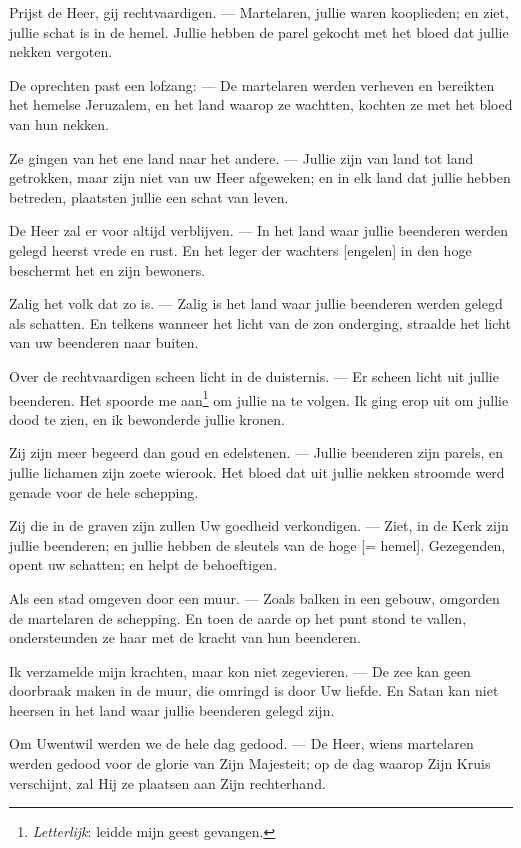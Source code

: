 \documentclass[12pt,twoside,a5paper]{article}
\begin{document}
\begin{halfparskip}
   Prijst de Heer, gij rechtvaardigen. --- Martelaren, jullie waren kooplieden; en ziet, jullie schat is in de hemel. Jullie hebben de parel gekocht met het bloed dat jullie nekken vergoten.

  De oprechten past een lofzang: --- De martelaren werden verheven en bereikten het hemelse Jeruzalem, en het land waarop ze wachtten, kochten ze met het bloed van hun nekken.

  Ze gingen van het ene land naar het andere. --- Jullie zijn van land tot land getrokken, maar zijn niet van uw Heer afgeweken; en in elk land dat jullie hebben betreden, plaatsten jullie een schat van leven.

  De Heer zal er voor altijd verblijven. --- In het land waar jullie beenderen werden gelegd heerst vrede en rust. En het leger der wachters [engelen] in den hoge beschermt het en zijn bewoners.

  Zalig het volk dat zo is. --- Zalig is het land waar jullie beenderen werden gelegd als schatten. En telkens wanneer het licht van de zon onderging, straalde het licht van uw beenderen naar buiten.

  Over de rechtvaardigen scheen licht in de duisternis. --- Er scheen licht uit jullie beenderen. Het spoorde me aan\footnote{\emph{Letterlijk}: leidde mijn geest gevangen.} om jullie na te volgen. Ik ging erop uit om jullie dood te zien, en ik bewonderde jullie kronen.

  Zij zijn meer begeerd dan goud en edelstenen. --- Jullie beenderen zijn parels, en jullie lichamen zijn zoete wierook. Het bloed dat uit jullie nekken stroomde werd genade voor de hele schepping.

  Zij die in de graven zijn zullen Uw goedheid verkondigen. --- Ziet, in de Kerk zijn jullie beenderen; en jullie hebben de sleutels van de hoge [= hemel]. Gezegenden, opent uw schatten; en helpt de behoeftigen.

  Als een stad omgeven door een muur. --- Zoals balken in een gebouw, omgorden de martelaren de schepping. En toen de aarde op het punt stond te vallen, ondersteunden ze haar met de kracht van hun beenderen.

  Ik verzamelde mijn krachten, maar kon niet zegevieren. --- De zee kan geen doorbraak maken in de muur, die omringd is door Uw liefde. En Satan kan niet heersen in het land waar jullie beenderen gelegd zijn.

  Om Uwentwil werden we de hele dag gedood. --- De Heer, wiens martelaren werden gedood voor de glorie van Zijn Majesteit; op de dag waarop Zijn Kruis verschijnt, zal Hij ze plaatsen aan Zijn rechterhand.


\end{halfparskip}
\end{document}
